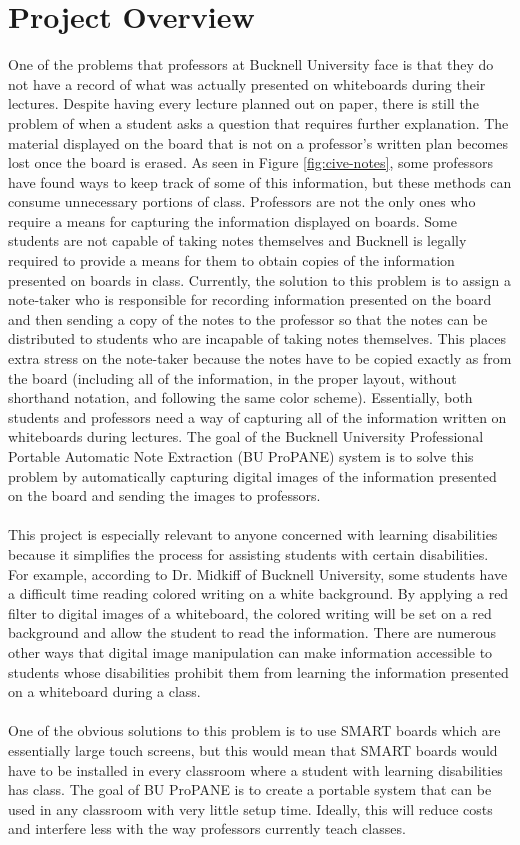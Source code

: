 \documentclass[]{article}
\begin{document}
	\section{Project Overview}
		One of the problems that professors at Bucknell University face is that they do not have a record of what was actually presented on whiteboards during their lectures. Despite having every lecture planned out on paper, there is still the problem of when a student asks a question that requires further explanation. The material displayed on the board that is not on a professor's written plan becomes lost once the board is erased. As seen in Figure \ref{fig:cive-notes}, some professors have found ways to keep track of some of this information, but these methods can consume unnecessary portions of class. Professors are not the only ones who require a means for capturing the information displayed on boards. Some students are not capable of taking notes themselves and Bucknell is legally required to provide a means for them to obtain copies of the information presented on boards in class. Currently, the solution to this problem is to assign a note-taker who is responsible for recording information presented on the board and then sending a copy of the notes to the professor so that the notes can be distributed to students who are incapable of taking notes themselves. This places extra stress on the note-taker because the notes have to be copied exactly as from the board (including all of the information, in the proper layout, without shorthand notation, and following the same color scheme). Essentially, both students and professors need a way of capturing all of the information written on whiteboards during lectures. The goal of the Bucknell University Professional Portable Automatic Note Extraction (BU ProPANE) system is to solve this problem by automatically capturing digital images of the information presented on the board and sending the images to professors.\\
		\\
		This project is especially relevant to anyone concerned with learning disabilities because it simplifies the process for assisting students with certain disabilities. For example, according to Dr. Midkiff of Bucknell University, some students have a difficult time reading colored writing on a white background. By applying a red filter to digital images of a whiteboard, the colored writing will be set on a red background and allow the student to read the information. There are numerous other ways that digital image manipulation can make information accessible to students whose disabilities prohibit them from learning the information presented on a whiteboard during a class.\\
		\\
		One of the obvious solutions to this problem is to use SMART boards which are essentially large touch screens, but this would mean that SMART boards would have to be installed in every classroom where a student with learning disabilities has class. The goal of BU ProPANE is to create a portable system that can be used in any classroom with very little setup time. Ideally, this will reduce costs and interfere less with the way professors currently teach classes. 
		
\end{document}
